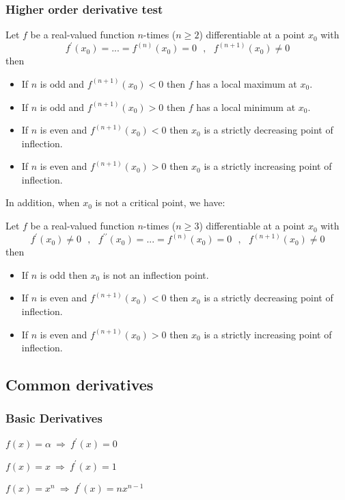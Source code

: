 \subsubsection{Higher order derivative test}
Let $f$ be a real-valued function $n$-times ($n\ge2$) differentiable at a point $x_0$ with
\[
f^\prime(x_0) = ... = f^{(n)}(x_0) = 0 ~~~, ~~~ f^{(n+1)}(x_0) \ne 0
\]
then
\begin{itemize}
	\item If $n$ is odd and  $ f^{(n+1)}(x_0)<0 $ then $f$ has a local maximum at $x_0$.
	\item If $n$ is odd and  $ f^{(n+1)}(x_0)>0 $ then $f$ has a local minimum at $x_0$.
	\item If $n$ is even and  $ f^{(n+1)}(x_0)<0 $ then $x_0$ is a strictly decreasing point of inflection.
	\item If $n$ is even and  $ f^{(n+1)}(x_0)>0 $ then $x_0$ is a strictly increasing point of inflection.
\end{itemize}

\medskip
In addition, when $x_0$ is not a critical point, we have:

Let $f$ be a real-valued function $n$-times ($n\ge3$) differentiable at a point $x_0$ with
\[
f^\prime(x_0)\ne0 ~~~, ~~~ f^{\prime\prime}(x_0) = ... = f^{(n)}(x_0) = 0 ~~~, ~~~ f^{(n+1)}(x_0) \ne 0
\]
then
\begin{itemize}
	\item If $n$ is odd then $x_0$ is not an inflection point.
	\item If $n$ is even and  $ f^{(n+1)}(x_0)<0 $ then $x_0$ is a strictly decreasing point of inflection.
	\item If $n$ is even and  $ f^{(n+1)}(x_0)>0 $ then $x_0$ is a strictly increasing point of inflection.
\end{itemize}



\subsection{Common derivatives}
\subsubsection{Basic Derivatives}
$ \displaystyle f(x)=\alpha ~ \Rightarrow ~ f^\prime(x)=0 $

$ \displaystyle f(x)=x ~ \Rightarrow ~ f^\prime(x)=1 $

$ \displaystyle f(x)=x^n ~ \Rightarrow ~ f^\prime(x)=n x^{n-1} $


